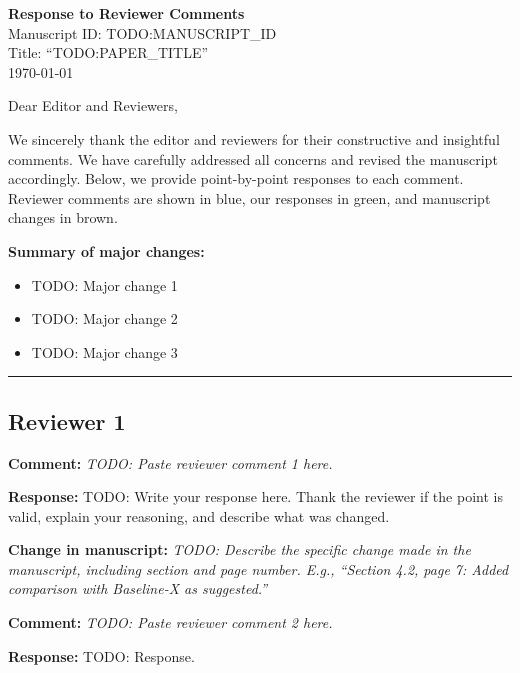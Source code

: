 \documentclass[11pt]{article}
\newcommand{\reviewer}[1]{\subsection*{#1}}
\newcommand{\comment}[1]{%
    \vspace{6pt}
    \noindent\textcolor{reviewercolor}{\textbf{Comment:} \textit{#1}}
    \vspace{4pt}
}
\newcommand{\response}[1]{%
    \noindent\textcolor{responsecolor}{\textbf{Response:}} #1
    \vspace{2pt}
}
\newcommand{\change}[1]{%
    \noindent\textcolor{changecolor}{\textbf{Change in manuscript:}} \textit{#1}
    \vspace{8pt}
}
\begin{document}
\begin{center}
    {\Large\textbf{Response to Reviewer Comments}}\\[8pt]
    {\large Manuscript ID: TODO:MANUSCRIPT\_ID}\\[4pt]
    {\large Title: ``TODO:PAPER\_TITLE''}\\[4pt]
    \today
\end{center}

\vspace{12pt}

\noindent Dear Editor and Reviewers,

\vspace{6pt}
\noindent We sincerely thank the editor and reviewers for their constructive and insightful comments. We have carefully addressed all concerns and revised the manuscript accordingly. Below, we provide point-by-point responses to each comment. Reviewer comments are shown in \textcolor{reviewercolor}{blue}, our responses in \textcolor{responsecolor}{green}, and manuscript changes in \textcolor{changecolor}{brown}.

\vspace{6pt}
\noindent \textbf{Summary of major changes:}
\begin{itemize}[nosep]
    \item TODO: Major change 1
    \item TODO: Major change 2
    \item TODO: Major change 3
\end{itemize}

\vspace{12pt}
\noindent\rule{\textwidth}{0.4pt}

\reviewer{Reviewer 1}

\comment{TODO: Paste reviewer comment 1 here.}

\response{TODO: Write your response here. Thank the reviewer if the point is valid, explain your reasoning, and describe what was changed.}

\change{TODO: Describe the specific change made in the manuscript, including section and page number. E.g., ``Section 4.2, page 7: Added comparison with Baseline-X as suggested.''}


\comment{TODO: Paste reviewer comment 2 here.}

\response{TODO: Response.}
\end{document}
